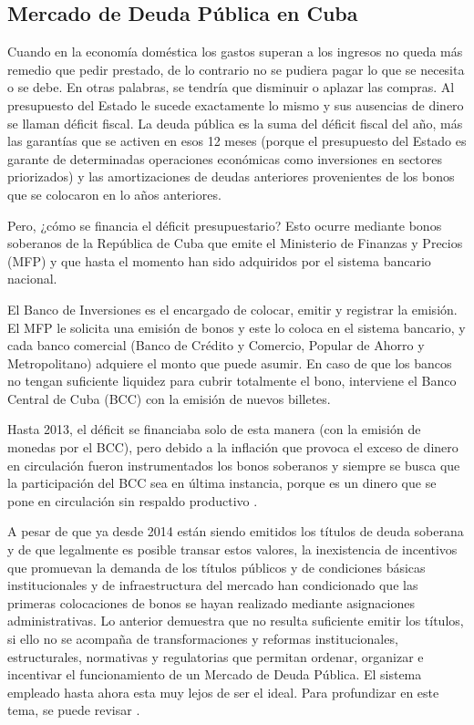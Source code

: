   \subsection{Mercado de Deuda Pública en Cuba} \hspace*{}

    Cuando en la economía doméstica los gastos superan a los ingresos no queda más remedio que pedir prestado, de lo contrario 
    no se pudiera pagar lo que se necesita o se debe. En otras palabras, se tendría que disminuir o aplazar las compras. Al presupuesto del 
    Estado le sucede exactamente lo mismo y sus ausencias de dinero se llaman déficit fiscal. La deuda pública es la suma del déficit 
    fiscal del año, más las garantías que se activen en esos 12 meses (porque el presupuesto del Estado es garante de determinadas 
    operaciones económicas como inversiones en sectores priorizados) y las amortizaciones de deudas anteriores provenientes de los bonos 
    que se colocaron en lo años anteriores.

    Pero, ¿cómo se financia el déficit presupuestario? Esto ocurre mediante bonos soberanos de la República de 
    Cuba que emite el Ministerio de Finanzas y Precios (MFP) y que hasta el momento han sido adquiridos por el sistema bancario nacional.

    El Banco de Inversiones es el encargado de colocar, emitir y registrar la emisión. El MFP le solicita una emisión de bonos y este lo 
    coloca en el sistema bancario, y cada banco comercial (Banco de Crédito y Comercio, Popular de Ahorro y Metropolitano) adquiere el 
    monto que puede asumir. En caso de que los bancos no tengan suficiente liquidez para cubrir totalmente el bono, interviene el Banco 
    Central de Cuba (BCC) con la emisión de nuevos billetes.

    Hasta 2013, el déficit se financiaba solo de esta manera (con la emisión de monedas por el BCC), pero debido a la inflación que 
    provoca el exceso de dinero en circulación fueron instrumentados los bonos soberanos y siempre se busca que la participación del 
    BCC sea en última instancia, porque es un dinero que se pone en circulación sin respaldo productivo \parencite{carmona2021}. 

    A pesar de que ya desde 2014 están siendo emitidos los títulos de deuda soberana y de que legalmente es posible transar estos valores, 
    la inexistencia de incentivos que promuevan la demanda de los títulos públicos y de condiciones básicas institucionales y de
    infraestructura del mercado han condicionado que las primeras colocaciones de bonos se hayan realizado mediante asignaciones 
    administrativas. Lo anterior demuestra que no resulta suficiente emitir los títulos, si ello no se acompaña de transformaciones y
    reformas institucionales, estructurales, normativas y regulatorias que permitan ordenar,
    organizar e incentivar el funcionamiento de un Mercado de Deuda Pública. El sistema empleado hasta ahora
    esta muy lejos de ser el ideal. Para profundizar en este tema, se puede revisar \parencite{barcelo2017}.

